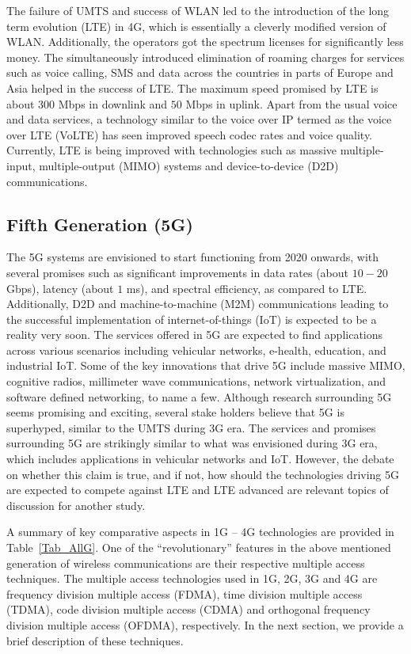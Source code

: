 \begin{multicols}{2}
The failure of UMTS and success of WLAN led to the introduction of the long term evolution (LTE) in 4G, which is essentially a cleverly modified version of WLAN. Additionally, the operators got the spectrum licenses for significantly less money. The simultaneously introduced elimination of roaming charges for services such as voice calling, SMS and data across the  countries in parts of Europe and Asia helped in the success of LTE. The maximum speed promised by LTE is about $300$ Mbps in downlink and $50$ Mbps in uplink. Apart from the usual voice and data services, a technology similar to the voice over IP termed as the voice over LTE (VoLTE) has seen improved speech codec rates and voice quality. Currently, LTE is being improved with technologies such as massive multiple-input, multiple-output (MIMO) systems and device-to-device (D2D) communications.

\subsection{Fifth Generation (5G)} \label{SubSec_5G}

The 5G systems are envisioned to start functioning from 2020 onwards, with several promises such as significant improvements in data rates (about $10-20$ Gbps), latency (about $1$ ms), and spectral efficiency, as compared to LTE. Additionally, D2D and machine-to-machine (M2M) communications leading to the successful implementation of internet-of-things (IoT) is expected to be a reality very soon. The services offered in 5G are expected to find applications across various scenarios including vehicular networks, e-health, education, and industrial IoT. Some of the key innovations that drive 5G include massive MIMO, cognitive radios, millimeter wave communications, network virtualization, and software defined networking, to name a few. Although research surrounding 5G seems promising and exciting, several stake holders believe that 5G is superhyped, similar to the UMTS during 3G era. The services and promises surrounding 5G are strikingly similar to what was envisioned during 3G era, which includes applications in vehicular networks and IoT. However, the debate on whether this claim is true, and if not, how should the technologies driving 5G are expected to compete against LTE and LTE advanced are relevant topics of discussion for another study.

A summary of key comparative aspects in 1G -- 4G technologies are provided in Table~\ref{Tab_AllG}. One of the ``revolutionary'' features in the above mentioned generation of wireless communications are their respective multiple access techniques. The multiple access technologies used in 1G, 2G, 3G and 4G are frequency division multiple access (FDMA), time division multiple access (TDMA), code division multiple access (CDMA) and orthogonal frequency division multiple access (OFDMA), respectively. In the next section, we provide a brief description of these techniques.
\end{multicols} 

